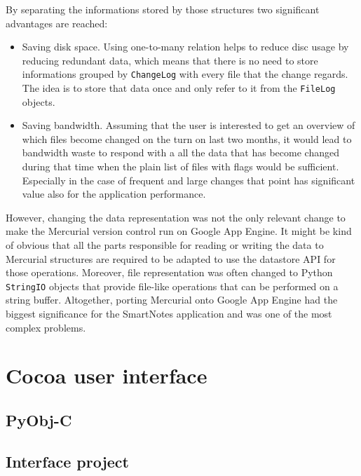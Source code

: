 
By separating the informations stored by those structures two significant advantages are reached:
\begin{itemize}
\item{Saving disk space. Using one-to-many relation helps to reduce disc usage by reducing redundant data, which means that there is no need to store informations grouped by \texttt{ChangeLog} with every file that the change regards. The idea is to store that data once and only refer to it from the \texttt{FileLog} objects.}
\item{Saving bandwidth. Assuming that the user is interested to get an overview of which files become changed on the turn on last two months, it would lead to bandwidth waste to respond with a all the data that has become changed during that time when the plain list of files with flags would be sufficient. Especially in the case of frequent and large changes that point has significant value also for the application performance.}
\end{itemize}
 
However, changing the data representation was not the only relevant change to make the Mercurial version control run on Google App Engine. It might be kind of obvious that all the parts responsible for reading or writing the data to Mercurial structures are required to be adapted to use the datastore API for those operations. Moreover, file representation was often changed to Python \texttt{StringIO} objects that provide file-like operations that can be performed on a string buffer. Altogether, porting Mercurial onto Google App Engine had the biggest significance for the SmartNotes application and was one of the most complex problems.      
 
\section{Cocoa user interface}\label{sec:cocoa}
\subsection{PyObj-C}
\subsection{Interface project}
 
